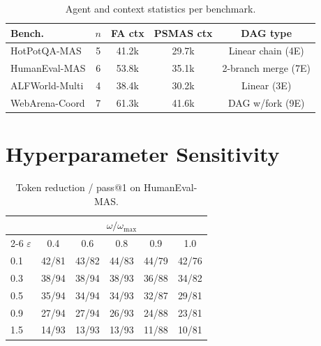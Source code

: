 \documentclass[10pt,twocolumn]{article}
\theoremstyle{plain}
\theoremstyle{definition}
\theoremstyle{remark}
\newcommand{\eps}{\varepsilon}
\newcommand{\sweepvel}{\omega}
\begin{document}
\begin{table}[H]
\centering\scriptsize
\caption{Agent and context statistics per benchmark.}
\label{tab:benchconfig}
\setlength{\tabcolsep}{2.5pt}
\begin{tabular}{@{}lcccc@{}}
\toprule
\textbf{Bench.} & $n$ & \textbf{FA ctx} & \textbf{PSMAS ctx} & \textbf{DAG type}\\
\midrule
HotPotQA-MAS  &5& 41.2k & 29.7k & Linear chain (4E)\\
HumanEval-MAS &6& 53.8k & 35.1k & 2-branch merge (7E)\\
ALFWorld-Multi&4& 38.4k & 30.2k & Linear (3E)\\
WebArena-Coord&7& 61.3k & 41.6k & DAG w/fork (9E)\\
\bottomrule
\end{tabular}
\end{table}

\section{Hyperparameter Sensitivity}
\label{app:hparam}

\begin{table}[H]
\centering\scriptsize
\caption{Token reduction / pass@1 on HumanEval-MAS.}
\label{tab:hparam}
\setlength{\tabcolsep}{2.5pt}
\begin{tabular}{@{}lccccc@{}}
\toprule
& \multicolumn{5}{c}{$\sweepvel/\sweepvel_{\max}$}\\
\cmidrule{2-6}
$\eps$ & 0.4 & 0.6 & 0.8 & 0.9 & 1.0\\
\midrule
0.1 & 42/81 & 43/82 & 44/83 & 44/79 & 42/76\\
0.3 & 38/94 & 38/94 & 38/93 & 36/88 & 34/82\\
0.5 & 35/94 & 34/94 & 34/93 & 32/87 & 29/81\\
0.9 & 27/94 & 27/94 & 26/93 & 24/88 & 23/81\\
1.5 & 14/93 & 13/93 & 13/93 & 11/88 & 10/81\\
\bottomrule
\end{tabular}
\end{table}
\end{document}
